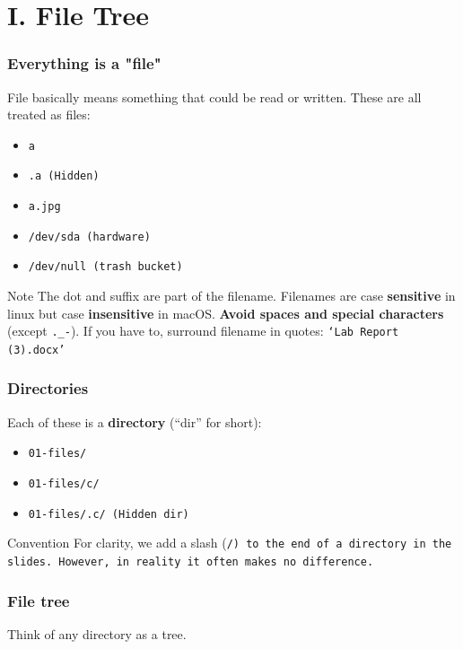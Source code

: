 \section{I. File Tree}
\begin{frame}[fragile]
\frametitle{Everything is a "file"}
File basically means something that could be read or written. These are all treated as files:
\begin{itemize}
    \item \tt{a}
    \item \tt{.a} (Hidden)
    \item \tt{a.jpg}
    \item \tt{/dev/sda} (hardware)
    \item \tt{/dev/null} (trash bucket)
\end{itemize}

\begin{block}{Note}
    The dot and suffix are part of the filename.
    \newline
    Filenames are case \textbf{sensitive} in linux but case \textbf{insensitive} in macOS.
    \newline
    \textbf{Avoid spaces and special characters} (except \verb|._-|).
    If you have to, surround filename in quotes:
    \tt{`Lab Report (3).docx'}
\end{block}
\end{frame}

\begin{frame}
\frametitle{Directories}
Each of these is a \textbf{directory} (``dir'' for short):
\begin{itemize}
    \item \tt{01-files/}
    \item \tt{01-files/c/}
    \item \tt{01-files/.c/} (Hidden dir)
\end{itemize}

\begin{block}{Convention}
    For clarity, we add a slash (\tt{/}) to the end of a directory in the
    slides. However, in reality it often makes no difference.
\end{block}
\end{frame}

\begin{frame}
\frametitle{File tree}
Think of any directory as a tree.

\begin{figure}[h]
    \centering
\end{figure}
\end{frame}

